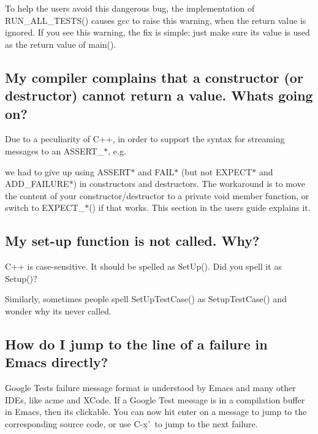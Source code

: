 To help the users avoid this dangerous bug, the implementation of {\ttfamily R\+U\+N\+\_\+\+A\+L\+L\+\_\+\+T\+E\+S\+T\+S()} causes gcc to raise this warning, when the return value is ignored. If you see this warning, the fix is simple\+: just make sure its value is used as the return value of {\ttfamily main()}.

\subsection*{My compiler complains that a constructor (or destructor) cannot return a value. What\textquotesingle{}s going on?}

Due to a peculiarity of C++, in order to support the syntax for streaming messages to an {\ttfamily A\+S\+S\+E\+R\+T\+\_\+$\ast$}, e.\+g.


\begin{DoxyCode}{0}
\end{DoxyCode}


we had to give up using {\ttfamily A\+S\+S\+E\+R\+T$\ast$} and {\ttfamily F\+A\+I\+L$\ast$} (but not {\ttfamily E\+X\+P\+E\+C\+T$\ast$} and {\ttfamily A\+D\+D\+\_\+\+F\+A\+I\+L\+U\+R\+E$\ast$}) in constructors and destructors. The workaround is to move the content of your constructor/destructor to a private void member function, or switch to {\ttfamily E\+X\+P\+E\+C\+T\+\_\+$\ast$()} if that works. This section in the user\textquotesingle{}s guide explains it.

\subsection*{My set-\/up function is not called. Why?}

C++ is case-\/sensitive. It should be spelled as {\ttfamily Set\+Up()}. Did you spell it as {\ttfamily Setup()}?

Similarly, sometimes people spell {\ttfamily Set\+Up\+Test\+Case()} as {\ttfamily Setup\+Test\+Case()} and wonder why it\textquotesingle{}s never called.

\subsection*{How do I jump to the line of a failure in Emacs directly?}

Google Test\textquotesingle{}s failure message format is understood by Emacs and many other I\+D\+Es, like acme and X\+Code. If a Google Test message is in a compilation buffer in Emacs, then it\textquotesingle{}s clickable. You can now hit {\ttfamily enter} on a message to jump to the corresponding source code, or use {\ttfamily C-\/x}\`{} to jump to the next failure.

